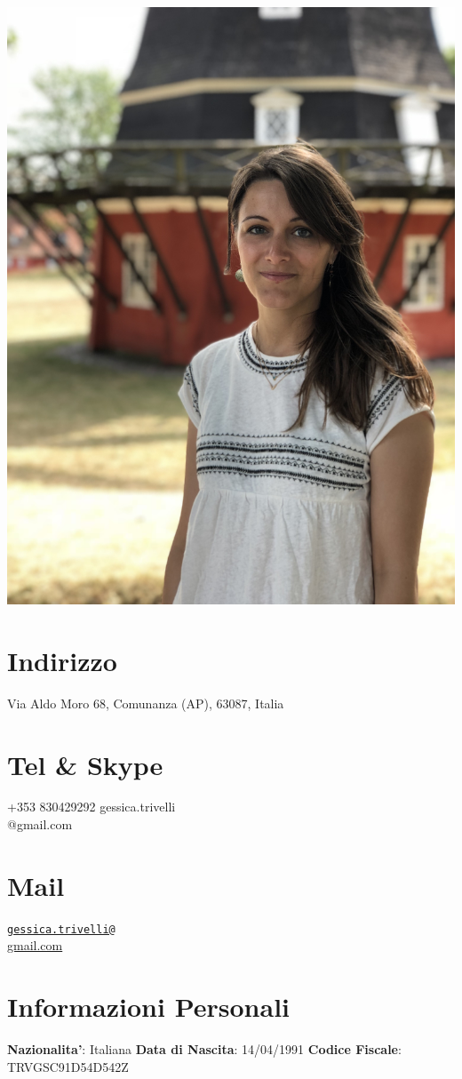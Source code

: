 \documentclass[11pt]{friggeri-cv}
\begin{document}

\begin{aside}
  \includegraphics[width=0.95\columnwidth]{img/IMG_2838}
  \section{Indirizzo}
    Via Aldo Moro 68,
    Comunanza (AP), 63087, Italia
  \section{Tel \& Skype}
    +353 830429292\vspace{3pt}
    gessica.trivelli\\@gmail.com
  \section{Mail}
    \href{mailto:gessica.trivelli@gmail.com}{\texttt{gessica.trivelli@}\\gmail.com}
  \section{Informazioni Personali}
    \textbf{Nazionalita'}: 
    Italiana
    \textbf{Data di Nascita}: 14/04/1991
    \textbf{Codice Fiscale}: TRVGSC91D54D542Z
\end{aside}
\end{document}
